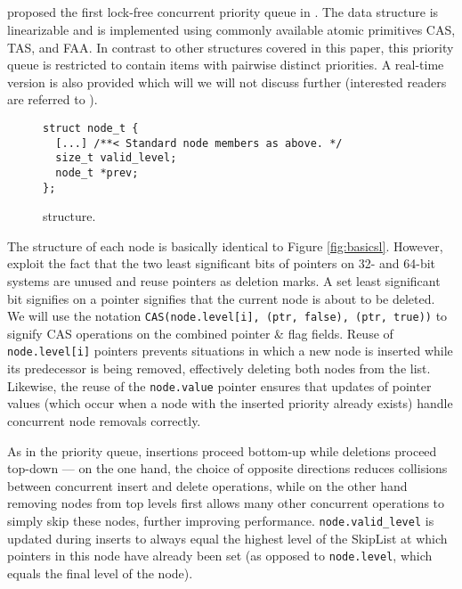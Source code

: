 \documentclass[a4paper,10pt]{article}
\begin{document}
\subsection{\citeauthor{sundell2003fast}} \label{sec:sundell}

\citeauthor{sundell2003fast} proposed the first lock-free concurrent priority queue in
\citeyear{sundell2003fast} \cite{sundell2003fast}. The data structure is linearizable
and is implemented using commonly available atomic primitives \ac{CAS}, \ac{TAS}, and \ac{FAA}.
In contrast to other structures covered in this paper, this priority queue is restricted to
contain items with pairwise distinct priorities.
A real-time version is also provided which will we will not discuss further (interested readers are
referred to \cite{sundell2003fast}).

\begin{figure}[h]
\begin{lstlisting}
struct node_t {
  [...] /**< Standard node members as above. */
  size_t valid_level;
  node_t *prev;
};
\end{lstlisting}
\caption{\citeauthor{sundell2003fast} structure.}
\label{fig:sundellsl}
\end{figure}

The structure of each node is basically identical to Figure \ref{fig:basicsl}. However, \citeauthor{sundell2003fast}
exploit the fact that the two least significant bits of pointers on 32- and 64-bit systems
are unused and reuse pointers as deletion marks. A set least significant bit signifies on a pointer signifies
that the current node is about to be deleted. We will use the notation 
\lstinline|CAS(node.level[i], (ptr, false), (ptr, true))| to signify \ac{CAS} operations on the
combined pointer \& flag fields.
Reuse of \lstinline|node.level[i]| pointers
prevents situations in which a new node is inserted while its predecessor is being removed,
effectively deleting both nodes from the list. Likewise, the reuse of the \lstinline|node.value|
pointer ensures that updates of pointer values (which occur when a node with the inserted priority already exists)
handle concurrent node removals correctly.

As in the \citeauthor{shavit2000skiplist} priority queue, insertions proceed bottom-up while
deletions proceed top-down --- on the one hand, the choice of opposite directions reduces collisions
between concurrent insert and delete operations, while on the other hand removing nodes from top levels first
allows many other concurrent operations to simply skip these nodes, further improving performance.
\lstinline|node.valid_level| is updated during inserts to always equal the highest level of the SkipList
at which pointers in this node have already been set (as opposed to \lstinline|node.level|, which equals
the final level of the node).
\end{document}
